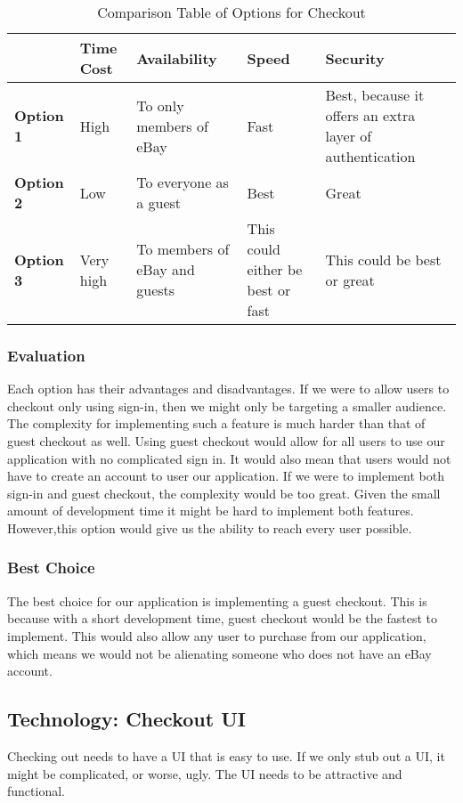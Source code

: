 \documentclass[journal,compsoc, 10pt, draftclsnofoot, onecolumn]{IEEEtran}
\begin{document}
\begin{table}[!h]
\centering
\caption{Comparison Table of Options for Checkout}
\label{Comparison Table of Options for Checkout}
\begin{tabularx}{\textwidth}{|l|l|l|l|X|}
\hline
\textbf{} & \textbf{Time Cost} & \textbf{Availability} & \textbf{Speed} &
\textbf{Security} \\ \hline
\textbf{Option 1} & High & To only members of eBay & Fast & Best, because it
offers an extra layer of authentication \\ \hline
\textbf{Option 2} & Low & To everyone as a guest & Best & Great \\ \hline
\textbf{Option 3} & Very high & To members of eBay and guests & This could
either be best or fast & This could be best or great \\ \hline
\end{tabularx}
\end{table}

\subsubsection{Evaluation}
Each option has their advantages and disadvantages. If we were to allow users to
 checkout only using sign-in, then we might only be targeting a smaller audience.
 The complexity for implementing such a feature is much harder than that of 
guest checkout as well. Using guest checkout would allow for all users to use our
application with no complicated sign in. It would also mean that users would not 
have to create an account to user our application. If we were to implement both
sign-in and guest checkout, the complexity would be too great. Given the small
amount of development time it might be hard to implement both features. 
However,this option would give us the ability to reach every user possible.

\subsubsection{Best Choice}
The best choice for our application is implementing a guest checkout. This is
because with a short development time, guest checkout would be the fastest to
implement. This would also allow any user to purchase from our application,
which means we would not be alienating someone who does not have an eBay
account.

\subsection{Technology: Checkout UI}
Checking out needs to have a UI that is easy to use. If we only stub out a UI,
it might be complicated, or worse, ugly. The UI needs to be attractive and
functional.
\end{document}
